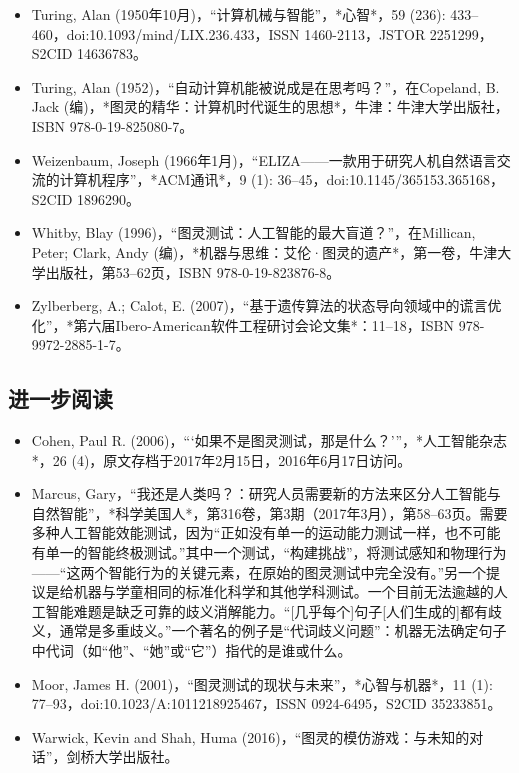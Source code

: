 \begin{itemize}
\item Turing, Alan (1950年10月)，“计算机械与智能”，*心智*，59 (236): 433–460，doi:10.1093/mind/LIX.236.433，ISSN 1460-2113，JSTOR 2251299，S2CID 14636783。
\item Turing, Alan (1952)，“自动计算机能被说成是在思考吗？”，在Copeland, B. Jack (编)，*图灵的精华：计算机时代诞生的思想*，牛津：牛津大学出版社，ISBN 978-0-19-825080-7。
\item Weizenbaum, Joseph (1966年1月)，“ELIZA——一款用于研究人机自然语言交流的计算机程序”，*ACM通讯*，9 (1): 36–45，doi:10.1145/365153.365168，S2CID 1896290。
\item Whitby, Blay (1996)，“图灵测试：人工智能的最大盲道？”，在Millican, Peter; Clark, Andy (编)，*机器与思维：艾伦·图灵的遗产*，第一卷，牛津大学出版社，第53–62页，ISBN 978-0-19-823876-8。
\item Zylberberg, A.; Calot, E. (2007)，“基于遗传算法的状态导向领域中的谎言优化”，*第六届Ibero-American软件工程研讨会论文集*：11–18，ISBN 978-9972-2885-1-7。
\end{itemize}
\subsection{进一步阅读}
\begin{itemize}
\item Cohen, Paul R. (2006)，“‘如果不是图灵测试，那是什么？’”，*人工智能杂志*，26 (4)，原文存档于2017年2月15日，2016年6月17日访问。
\item Marcus, Gary，“我还是人类吗？：研究人员需要新的方法来区分人工智能与自然智能”，*科学美国人*，第316卷，第3期（2017年3月），第58–63页。需要多种人工智能效能测试，因为“正如没有单一的运动能力测试一样，也不可能有单一的智能终极测试。”其中一个测试，“构建挑战”，将测试感知和物理行为——“这两个智能行为的关键元素，在原始的图灵测试中完全没有。”另一个提议是给机器与学童相同的标准化科学和其他学科测试。一个目前无法逾越的人工智能难题是缺乏可靠的歧义消解能力。“[几乎每个]句子[人们生成的]都有歧义，通常是多重歧义。”一个著名的例子是“代词歧义问题”：机器无法确定句子中代词（如“他”、“她”或“它”）指代的是谁或什么。
\item Moor, James H. (2001)，“图灵测试的现状与未来”，*心智与机器*，11 (1): 77–93，doi:10.1023/A:1011218925467，ISSN 0924-6495，S2CID 35233851。
\item Warwick, Kevin and Shah, Huma (2016)，“图灵的模仿游戏：与未知的对话”，剑桥大学出版社。
\end{itemize}
